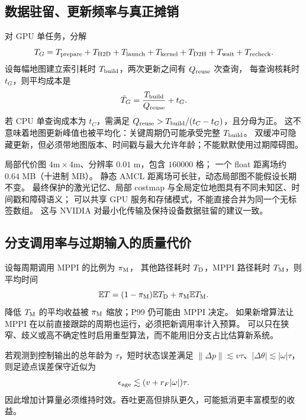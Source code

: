 \subsection{数据驻留、更新频率与真正摊销}
对 GPU 单任务，分解
\begin{equation}
T_G=T_{\rm prepare}+T_{\rm H2D}+T_{\rm launch}
+T_{\rm kernel}+T_{\rm D2H}+T_{\rm wait}+T_{\rm recheck}.
\end{equation}
设每幅地图建立索引耗时 $T_{\rm build}$，两次更新之间有 $Q_{\rm reuse}$ 次查询，
每查询核耗时 $t_G$，则平均成本是
\begin{equation}
\bar T_G=\frac{T_{\rm build}}{Q_{\rm reuse}}+t_G.
\label{eq:amort}
\end{equation}
若 CPU 单查询成本为 $t_C$，需满足
$Q_{\rm reuse}>T_{\rm build}/(t_C-t_G)$，且分母为正。
这不意味着地图更新峰值也被平均化：关键周期仍可能承受完整 $T_{\rm build}$。
双缓冲可隐藏更新，但必须带地图版本、时间戳与最大允许年龄；不能默默使用过期障碍图。

局部代价图 $4\mathrm m\times4\mathrm m$、分辨率 $0.01$ m，包含 $160000$ 格；
一个 float 距离场约 $0.64$ MB（十进制 MB）。
静态 AMCL 距离场可长驻，动态局部图不能假设长期不变。
最终保护的激光记忆、局部 costmap 与全局定位地图具有不同未知区、时间戳和障碍语义；
可以共享 GPU 服务和存储模式，不能直接合并为同一个无标签数组。
这与 NVIDIA 对最小化传输及保持设备数据驻留的建议一致\cite{cuda}。

\subsection{分支调用率与过期输入的质量代价}
设每周期调用 MPPI 的比例为 $\pi_{\rm M}$，
其他路径耗时 $T_{\rm D}$，MPPI 路径耗时 $T_{\rm M}$，则平均时间
\[
\mathbb E T=(1-\pi_{\rm M})\mathbb E T_{\rm D}+\pi_{\rm M}\mathbb E T_{\rm M}.
\]
降低 $T_{\rm M}$ 的平均收益被 $\pi_{\rm M}$ 缩放；P99 仍可能由 MPPI 决定。
如果新增算法让 MPPI 在以前直接跟踪的周期也运行，必须把新调用率计入预算。
可以只在狭窄、歧义或高不确定性时启用重型算法，而不能用旧分支占比估算新系统。

若观测到控制输出的总年龄为 $\tau$，短时状态误差满足
$\|\Delta p\|\lesssim v\tau$、$|\Delta\theta|\lesssim|\omega|\tau$，
则足迹点误差保守近似为
\[
\epsilon_{\rm age}\lesssim(v+r_F|\omega|)\tau.
\]
因此增加计算量必须维持时效。吞吐更高但排队更久，可能抵消更丰富模型的收益。
